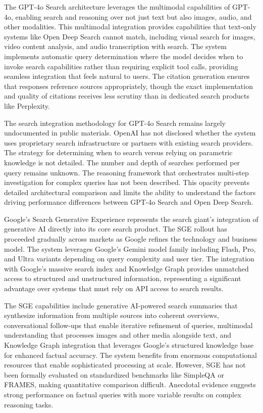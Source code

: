 The GPT-4o Search architecture leverages the multimodal capabilities of GPT-4o, enabling search and reasoning over not just text but also images, audio, and other modalities. This multimodal integration provides capabilities that text-only systems like Open Deep Search cannot match, including visual search for images, video content analysis, and audio transcription with search. The system implements automatic query determination where the model decides when to invoke search capabilities rather than requiring explicit tool calls, providing seamless integration that feels natural to users. The citation generation ensures that responses reference sources appropriately, though the exact implementation and quality of citations receives less scrutiny than in dedicated search products like Perplexity.

The search integration methodology for GPT-4o Search remains largely undocumented in public materials. OpenAI has not disclosed whether the system uses proprietary search infrastructure or partners with existing search providers. The strategy for determining when to search versus relying on parametric knowledge is not detailed. The number and depth of searches performed per query remains unknown. The reasoning framework that orchestrates multi-step investigation for complex queries has not been described. This opacity prevents detailed architectural comparison and limits the ability to understand the factors driving performance differences between GPT-4o Search and Open Deep Search.

Google's Search Generative Experience represents the search giant's integration of generative AI directly into its core search product. The SGE rollout has proceeded gradually across markets as Google refines the technology and business model. The system leverages Google's Gemini model family including Flash, Pro, and Ultra variants depending on query complexity and user tier. The integration with Google's massive search index and Knowledge Graph provides unmatched access to structured and unstructured information, representing a significant advantage over systems that must rely on API access to search results.

The SGE capabilities include generative AI-powered search summaries that synthesize information from multiple sources into coherent overviews, conversational follow-ups that enable iterative refinement of queries, multimodal understanding that processes images and other media alongside text, and Knowledge Graph integration that leverages Google's structured knowledge base for enhanced factual accuracy. The system benefits from enormous computational resources that enable sophisticated processing at scale. However, SGE has not been formally evaluated on standardized benchmarks like SimpleQA or FRAMES, making quantitative comparison difficult. Anecdotal evidence suggests strong performance on factual queries with more variable results on complex reasoning tasks.

